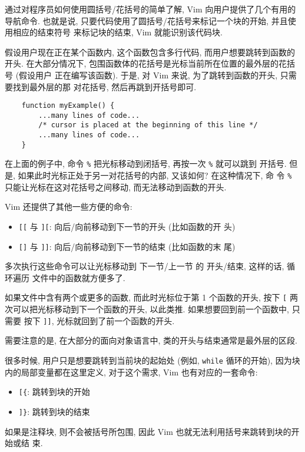 通过对程序员如何使用圆括号/花括号的简单了解, Vim 向用户提供了几个有用的导航命令.
也就是说, 只要代码使用了圆括号/花括号来标记一个块的开始, 并且使用相应的结束符号
来标记块的结束, Vim 就能识别该代码块.

假设用户现在正在某个函数内, 这个函数包含多行代码, 而用户想要跳转到函数的开头.
在大部分情况下, 包围函数体的花括号是光标当前所在位置的最外层的花括号 (假设用户
正在编写该函数). 于是, 对 Vim 来说, 为了跳转到函数的开头, 只需要找到最外层的那
对花括号, 然后再跳到开括号即可.
\begin{verbatim}
    function myExample() {
        ...many lines of code...
        /* cursor is placed at the beginning of this line */
        ...many lines of code...
    }
\end{verbatim}
在上面的例子中, 命令 \verb'%' 把光标移动到闭括号, 再按一次 \verb'%' 就可以跳到
开括号. 但是, 如果此时光标正处于另一对花括号的内部, 又该如何? 在这种情况下, 命
令 \verb'%' 只能让光标在这对花括号之间移动, 而无法移动到函数的开头.

Vim 还提供了其他一些方便的命令:
\begin{itemize}
    \item \texttt{[[} 与  \texttt{][}: 向后/向前移动到下一节的开头 (比如函数的开
        头)
    \item \texttt{[]} 与  \texttt{]]}: 向后/向前移动到下一节的结束 (比如函数的末
        尾)
\end{itemize}
多次执行这些命令可以让光标移动到 下一节/上一节 的 开头/结束, 这样的话, 循环遍历
文件中的函数就方便多了.

如果文件中含有两个或更多的函数, 而此时光标位于第 1 个函数的开头, 按下 \texttt{[}
两次可以把光标移动到下一个函数的开头, 以此类推. 如果想要回到前一个函数中, 只需要
按下 \texttt{]]}, 光标就回到了前一个函数的开头.
\begin{warning}
    需要注意的是, 在大部分的面向对象语言中, 类的开头与结束通常是最外层的区段.
\end{warning}

很多时候, 用户只是想要跳转到当前块的起始处 (例如, \texttt{while} 循环的开始),
因为块内的局部变量都在这里定义, 对于这个需求, Vim 也有对应的一套命令:
\begin{itemize}
    \item \verb'[{': 跳转到块的开始
    \item \verb']}': 跳转到块的结束
\end{itemize}

如果是注释块, 则不会被括号所包围, 因此 Vim 也就无法利用括号来跳转到块的开始或结
束.

